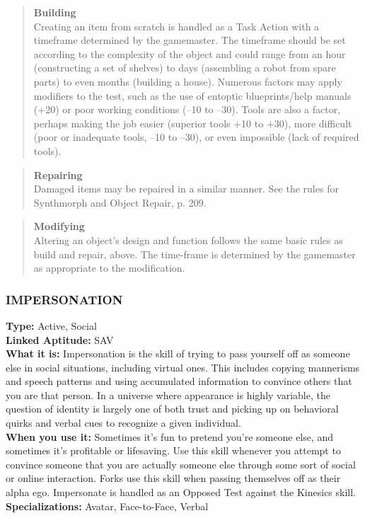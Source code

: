 \begin{quotation}
\textbf{Building}
\\
Creating an item from scratch is handled as a Task
Action with a timeframe determined by the gamemaster. The timeframe should be set according to the complexity of the object and could range from an hour
(constructing a set of shelves) to days (assembling a
robot from spare parts) to even months (building a
house). Numerous factors may apply modifiers to
the test, such as the use of entoptic blueprints/help
manuals (+20) or poor working conditions (–10 to
–30). Tools are also a factor, perhaps making the job
easier (superior tools +10 to +30), more difficult (poor
or inadequate tools, –10 to –30), or even impossible
(lack of required tools).
\end{quotation}

\begin{quotation}
\textbf{Repairing}
\\
Damaged items may be repaired in a similar manner. See
the rules for Synthmorph and Object Repair, p. 209.
\end{quotation}


\begin{quotation}
\textbf{Modifying}
\\
Altering an object’s design and function follows the
same basic rules as build and repair, above. The time-frame is determined by the gamemaster as appropriate
to the modification.
\end{quotation}




\subsubsection{IMPERSONATION}
\textbf{Type:} Active, Social
\\ \textbf{Linked Aptitude:} SAV
\\ \textbf{What it is:} Impersonation is the skill of trying to
pass yourself off as someone else in social situations,
including virtual ones. This includes copying mannerisms and speech patterns and using accumulated information to convince others that you are that person.
In a universe where appearance is highly variable, the
question of identity is largely one of both trust and
picking up on behavioral quirks and verbal cues to
recognize a given individual.
\\ \textbf{When you use it:} Sometimes it’s fun to pretend
you’re someone else, and sometimes it’s profitable
or lifesaving. Use this skill whenever you attempt
to convince someone that you are actually someone
else through some sort of social or online interaction.
Forks use this skill when passing themselves off as
their alpha ego. Impersonate is handled as an Opposed Test against the Kinesics skill.
\\ \textbf{Specializations:} Avatar, Face-to-Face, Verbal

